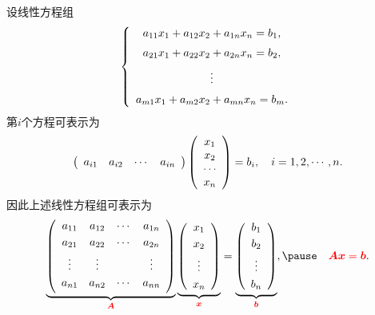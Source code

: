 \begin{frame}
  \begin{footnotesize}
    设线性方程组
    $$
    \left\{
      \begin{array}{c}
        a_{11}x_1 + a_{12}x_2 + a_{1n}x_n = b_1, \\[0.2cm]
        a_{21}x_1 + a_{22}x_2 + a_{2n}x_n = b_2, \\[0.2cm]
        \vdots \\[0.2cm]
        a_{m1}x_1 + a_{m2}x_2 + a_{mn}x_n = b_m.
      \end{array}
    \right.
    $$
    \pause
    第$i$个方程可表示为
    $$
    \left(
      \begin{array}{cccc}
        a_{i1} & a_{i2} & \cdots &  a_{in}
      \end{array}
    \right)
    \left(
      \begin{array}{c}
        x_{1} \\
        x_{2} \\
        \cdots   \\
        x_{n}
      \end{array}
    \right) = b_i, \quad i=1,2,\cdots,n.
    $$\pause 
    因此上述线性方程组可表示为
    $$
    \underbrace{
      \left(
        \begin{array}{cccc}
          a_{11} & a_{12} & \cd &  a_{1n} \\[0.1cm]
          a_{21} & a_{22} & \cd &  a_{2n} \\[0.1cm]
          \vd   & \vd   &     & \vd \\[0.1cm]
          a_{n1} & a_{n2} & \cd &  a_{nn} \\[0.1cm]
        \end{array}
      \right)
    }_{\red{\A}}
    \underbrace{
      \left(
        \begin{array}{c}
          x_{1} \\[0.1cm]
          x_{2} \\[0.1cm]
          \vd  \\[0.1cm]
          x_{n}
        \end{array}
      \right)
    }_{\red{\xx}}
    =     
    \underbrace{
      \left(
        \begin{array}{c}
          b_{1} \\[0.1cm]
          b_{2} \\[0.1cm]
          \vd  \\[0.1cm]
          b_{n}
        \end{array}
      \right)
    }_{\red{\bb}},  
    \pause \quad \red{\A\xx=\bb}.
    $$
  \end{footnotesize}
\end{frame}


